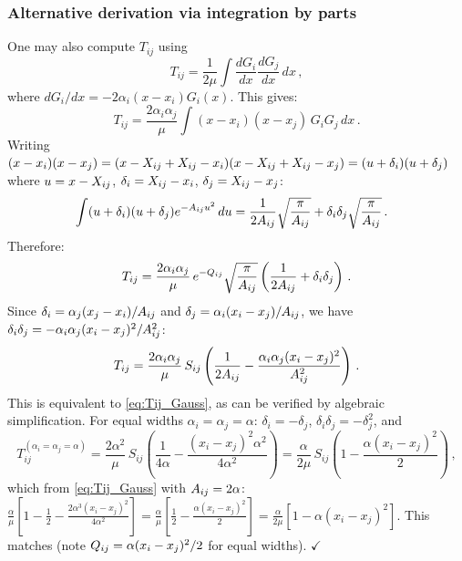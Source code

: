 \subsubsection{Alternative derivation via integration by parts}

One may also compute $T_{ij}$ using
\begin{equation}
  T_{ij} = \frac{1}{2\mu}\int\frac{dG_i}{dx}\frac{dG_j}{dx}\,dx\,,
\end{equation}
where $dG_i/dx = -2\alpha_i(x-x_i)G_i(x)$. This gives:
\begin{equation}
  T_{ij} = \frac{2\alpha_i\alpha_j}{\mu}\int(x-x_i)(x-x_j)\,G_i G_j\,dx\,.
\end{equation}
Writing $(x-x_i)(x-x_j) = (x-X_{ij}+X_{ij}-x_i)(x-X_{ij}+X_{ij}-x_j) = (u+\delta_i)(u+\delta_j)$
where $u = x - X_{ij}$, $\delta_i = X_{ij} - x_i$, $\delta_j = X_{ij} - x_j$:
\begin{align}
  &\int(u+\delta_i)(u+\delta_j)e^{-A_{ij} u^2}\,du
  = \frac{1}{2A_{ij}}\sqrt{\frac{\pi}{A_{ij}}} + \delta_i\delta_j\sqrt{\frac{\pi}{A_{ij}}}\,.
\end{align}
Therefore:
\begin{equation}
  T_{ij} = \frac{2\alpha_i\alpha_j}{\mu}\,e^{-Q_{ij}}\sqrt{\frac{\pi}{A_{ij}}}\left(\frac{1}{2A_{ij}}+\delta_i\delta_j\right)\,.
\end{equation}
Since $\delta_i = \alpha_j(x_j-x_i)/A_{ij}$ and $\delta_j = \alpha_i(x_i-x_j)/A_{ij}$,
we have $\delta_i\delta_j = -\alpha_i\alpha_j(x_i-x_j)^2/A_{ij}^2$:
\begin{equation}
  T_{ij} = \frac{2\alpha_i\alpha_j}{\mu}\,S_{ij}\left(\frac{1}{2A_{ij}} - \frac{\alpha_i\alpha_j(x_i-x_j)^2}{A_{ij}^2}\right)\,.
\end{equation}
This is equivalent to \cref{eq:Tij_Gauss}, as can be verified by algebraic simplification.
For equal widths $\alpha_i = \alpha_j = \alpha$: $\delta_i = -\delta_j$, $\delta_i\delta_j = -\delta_j^2$, and
\begin{equation}
  T_{ij}^{(\alpha_i=\alpha_j=\alpha)} = \frac{2\alpha^2}{\mu}\,S_{ij}\left(\frac{1}{4\alpha} - \frac{(x_i-x_j)^2\alpha^2}{4\alpha^2}\right)
  = \frac{\alpha}{2\mu}\,S_{ij}\left(1 - \frac{\alpha(x_i-x_j)^2}{2}\right)\,,
\end{equation}
which from \cref{eq:Tij_Gauss} with $A_{ij} = 2\alpha$:
$\frac{\alpha}{\mu}\left[1 - \frac{1}{2} - \frac{2\alpha^3(x_i-x_j)^2}{4\alpha^2}\right]
= \frac{\alpha}{\mu}\left[\frac{1}{2} - \frac{\alpha(x_i-x_j)^2}{2}\right]
= \frac{\alpha}{2\mu}\left[1 - \alpha(x_i-x_j)^2\right]$. This matches (note $Q_{ij} = \alpha(x_i-x_j)^2/2$ for equal widths). $\checkmark$

